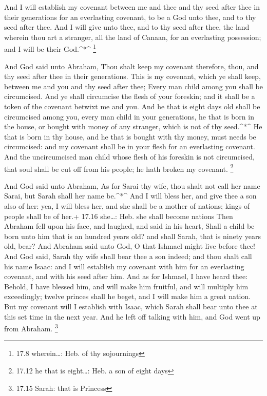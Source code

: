 And I will establish my covenant between me and thee and
thy seed after thee in their generations for an everlasting covenant, to
be a God unto thee, and to thy seed after thee.  And I will
give unto thee, and to thy seed after thee, the land wherein thou art a
stranger, all the land of Canaan, for an everlasting possession; and I
will be their God.\^{}*\^{} \footnote{17.8 wherein\ldots: Heb. of thy
  sojournings}

 And God said unto Abraham, Thou shalt keep my covenant
therefore, thou, and thy seed after thee in their generations.
 This is my covenant, which ye shall keep, between me and
you and thy seed after thee; Every man child among you shall be
circumcised.  And ye shall circumcise the flesh of your
foreskin; and it shall be a token of the covenant betwixt me and you.
 And he that is eight days old shall be circumcised among
you, every man child in your generations, he that is born in the house,
or bought with money of any stranger, which is not of thy seed.\^{}*\^{}
 He that is born in thy house, and he that is bought with
thy money, must needs be circumcised: and my covenant shall be in your
flesh for an everlasting covenant.  And the uncircumcised
man child whose flesh of his foreskin is not circumcised, that soul
shall be cut off from his people; he hath broken my covenant.
\footnote{17.12 he that is eight\ldots: Heb. a son of eight days}

 And God said unto Abraham, As for Sarai thy wife, thou
shalt not call her name Sarai, but Sarah shall her name be.\^{}*\^{}
 And I will bless her, and give thee a son also of her:
yea, I will bless her, and she shall be a mother of nations; kings of
people shall be of her.+ 17.16 she\ldots: Heb. she shall become nations
 Then Abraham fell upon his face, and laughed, and said in
his heart, Shall a child be born unto him that is an hundred years old?
and shall Sarah, that is ninety years old, bear?  And
Abraham said unto God, O that Ishmael might live before thee!
 And God said, Sarah thy wife shall bear thee a son indeed;
and thou shalt call his name Isaac: and I will establish my covenant
with him for an everlasting covenant, and with his seed after him.
 And as for Ishmael, I have heard thee: Behold, I have
blessed him, and will make him fruitful, and will multiply him
exceedingly; twelve princes shall he beget, and I will make him a great
nation.  But my covenant will I establish with Isaac, which
Sarah shall bear unto thee at this set time in the next year.
 And he left off talking with him, and God went up from
Abraham. \footnote{17.15 Sarah: that is Princess}

